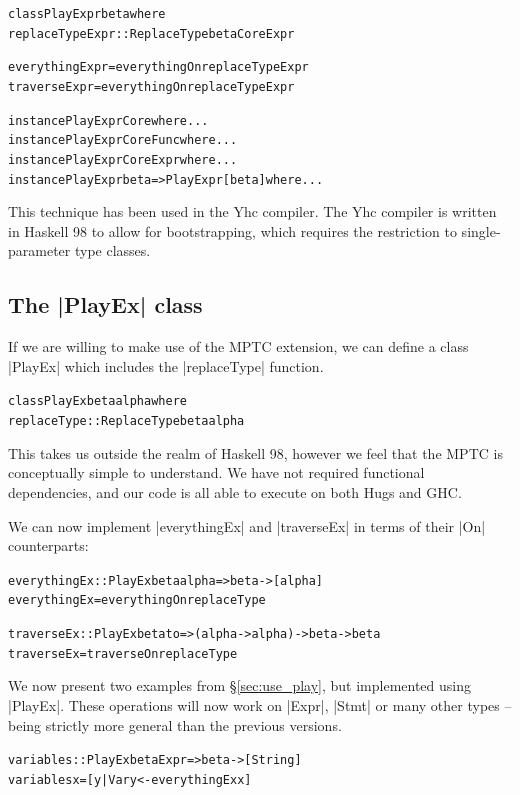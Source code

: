\documentclass[preprint]{sigplanconf}
\newenvironment{code}{\begin{alltt}\small}{\end{alltt}}
\begin{document}
\begin{code}
class  PlayExpr beta where
       replaceTypeExpr :: ReplaceType beta CoreExpr

everythingExpr  = everythingOn replaceTypeExpr
traverseExpr    = everythingOn replaceTypeExpr

instance PlayExpr Core where ...
instance PlayExpr CoreFunc where ...
instance PlayExpr CoreExpr where ...
instance PlayExpr beta => PlayExpr [beta] where ...
\end{code}

This technique has been used in the Yhc compiler. The Yhc compiler is written in Haskell 98 to allow for bootstrapping, which requires the restriction to single-parameter type classes.

\subsection{The |PlayEx| class}

If we are willing to make use of the MPTC extension, we can define a class |PlayEx| which includes the |replaceType| function.

\begin{code}
class  PlayEx beta alpha where
       replaceType :: ReplaceType beta alpha
\end{code}

This takes us outside the realm of Haskell 98, however we feel that the MPTC is conceptually simple to understand. We have not required functional dependencies, and our code is all able to execute on both Hugs and GHC.

We can now implement |everythingEx| and |traverseEx| in terms of their |On| counterparts:

\begin{code}
everythingEx  :: PlayEx beta alpha => beta -> [alpha]
everythingEx  = everythingOn replaceType

traverseEx    :: PlayEx beta to => (alpha -> alpha) -> beta -> beta
traverseEx    = traverseOn replaceType
\end{code}

We now present two examples from \S\ref{sec:use_play}, but implemented using |PlayEx|. These operations will now work on |Expr|, |Stmt| or many other types -- being strictly more general than the previous versions.

\begin{code}
variables :: PlayEx beta Expr => beta -> [String]
variables x = [y | Var y <- everythingEx x]
\end{code}
\end{document}
